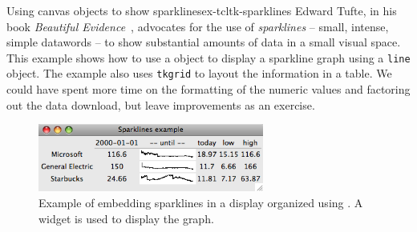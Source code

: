 \begin{example}{Using canvas objects to show sparklines}{ex-tcltk-sparklines}
Edward Tufte, in his book \textit{Beautiful
  Evidence}~\cite{Tufte:Beautiful-Evidence}, advocates for the use of
\textit{sparklines} -- small, intense, simple datawords -- to show substantial
amounts of data in a small visual space. This example shows how to use
a  object to display a sparkline graph using a \texttt{line} object. The example also uses \texttt{tkgrid}
to layout the information in a  table. We could have spent more time on the
formatting of the numeric values and factoring out the data download, but leave improvements as an exercise.


\begin{figure}
  \centering
  \includegraphics[width=0.66\textwidth]{fig-tcltk-sparklines.png}
  \caption{Example of embedding sparklines in a display organized
    using . A  widget is used to display
    the graph.}
  \label{fig:fig-tcltk-sparklines}
\end{figure}



\end{example}
